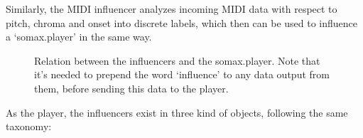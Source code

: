 Similarly, the MIDI influencer analyzes incoming MIDI data with respect to pitch, chroma and onset into discrete labels, which then can be used to influence a `somax.player' in the same way. 

\begin{figure}[H]
  \centering
  \hfill
  \caption{Relation between the influencers and the somax.player. Note that it's needed to prepend the word `influence' to any data output from them, before sending this data to the player.}
\end{figure}

As the player, the influencers exist in three kind of objects, following the same taxonomy:

